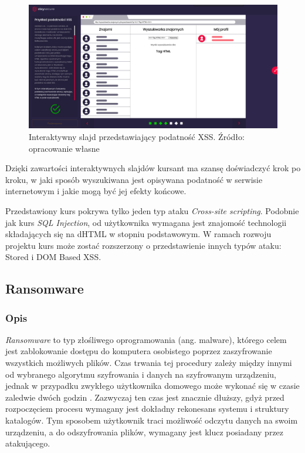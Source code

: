 \documentclass[12pt,twoside]{article}
\begin{document}
\begin{figure}[H]
	\centering
	\includegraphics[width=1\linewidth]{figures/xss-slide-screenshot2}
	\caption{Interaktywny slajd przedstawiający podatność XSS. Źródło: opracowanie własne}
\end{figure}

Dzięki zawartości interaktywnych slajdów kursant ma szansę doświadczyć krok po kroku, w jaki sposób wyszukiwana jest opisywana podatność w serwisie internetowym i jakie mogą być jej efekty końcowe. 

Przedstawiony kurs pokrywa tylko jeden typ ataku \emph{Cross-site scripting}. Podobnie jak kurs \emph{SQL Injection}, od użytkownika wymagana jest znajomość technologii składających się na dHTML w stopniu podstawowym. W ramach rozwoju projektu kurs może zostać rozszerzony o przedstawienie innych typów ataku: Stored i DOM Based XSS.


\clearpage

\subsection{Ransomware}
\subsubsection{Opis}
\emph{Ransomware} to typ złośliwego oprogramowania (ang. malware), którego celem jest zablokowanie dostępu do komputera osobistego poprzez zaszyfrowanie wszystkich możliwych plików. Czas trwania tej procedury zależy między innymi od wybranego algorytmu szyfrowania i danych na szyfrowanym urządzeniu, jednak w przypadku zwykłego użytkownika domowego może wykonać się w czasie zaledwie dwóch godzin \cite{RansomwareTime}. Zazwyczaj ten czas jest znacznie dłuższy, gdyż przed rozpoczęciem procesu wymagany jest dokładny rekonesans systemu i struktury katalogów. Tym sposobem użytkownik traci możliwość odczytu danych na swoim urządzeniu, a do odszyfrowania plików, wymagany jest klucz posiadany przez atakującego. 
\end{document}
